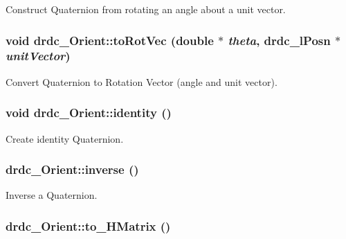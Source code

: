 Construct Quaternion from rotating an angle about a unit vector. 

\hypertarget{classdrdc__Orient_035e8decc314d880060461ddd413775d}{
\subsubsection[toRotVec]{\setlength{\rightskip}{0pt plus 5cm}void drdc\_\-Orient::toRotVec (double $\ast$ {\em theta}, \/  {\bf drdc\_\-lPosn} $\ast$ {\em unitVector})}}
\label{classdrdc__Orient_035e8decc314d880060461ddd413775d}


Convert Quaternion to Rotation Vector (angle and unit vector). 

\hypertarget{classdrdc__Orient_0464af38b73dee1656d6fe3e080e76d7}{
\subsubsection[identity]{\setlength{\rightskip}{0pt plus 5cm}void drdc\_\-Orient::identity ()}}
\label{classdrdc__Orient_0464af38b73dee1656d6fe3e080e76d7}


Create identity Quaternion. 

\hypertarget{classdrdc__Orient_de09f9c9a7a6773fa7e33c1f8816f6c0}{
\subsubsection[inverse]{ drdc\_\-Orient::inverse ()}}
\label{classdrdc__Orient_de09f9c9a7a6773fa7e33c1f8816f6c0}


Inverse a Quaternion. 

\hypertarget{classdrdc__Orient_1ada30d0a48a4c563c6b8d97c40446ac}{
\subsubsection[to\_\-HMatrix]{ drdc\_\-Orient::to\_\-HMatrix ()}}
\label{classdrdc__Orient_1ada30d0a48a4c563c6b8d97c40446ac}


